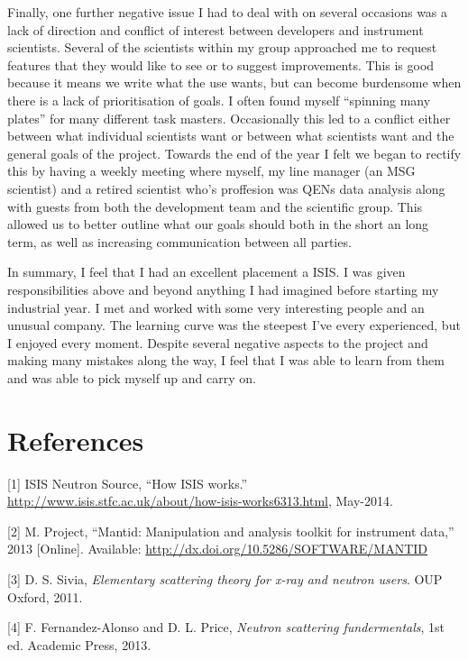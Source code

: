 \documentclass[paper=a4, fontsize=11pt]{scrartcl}	%
\numberwithin{equation}{section}															%
\numberwithin{figure}{section}																%
\numberwithin{table}{section}
\begin{document}
Finally, one further negative issue I had to deal with on several
occasions was a lack of direction and conflict of interest between
developers and instrument scientists. Several of the scientists within
my group approached me to request features that they would like to see
or to suggest improvements. This is good because it means we write what
the use wants, but can become burdensome when there is a lack of
prioritisation of goals. I often found myself ``spinning many plates''
for many different task masters. Occasionally this led to a conflict
either between what individual scientists want or between what
scientists want and the general goals of the project. Towards the end of
the year I felt we began to rectify this by having a weekly meeting
where myself, my line manager (an MSG scientist) and a retired scientist
who's proffesion was QENs data analysis along with guests from both the
development team and the scientific group. This allowed us to better
outline what our goals should both in the short an long term, as well as
increasing communication between all parties.

In summary, I feel that I had an excellent placement a ISIS. I was given
responsibilities above and beyond anything I had imagined before
starting my industrial year. I met and worked with some very interesting
people and an unusual company. The learning curve was the steepest I've
every experienced, but I enjoyed every moment. Despite several negative
aspects to the project and making many mistakes along the way, I feel
that I was able to learn from them and was able to pick myself up and
carry on.

\section*{References}\label{references}

{[}1{]} ISIS Neutron Source, ``How ISIS works.''
\url{http://www.isis.stfc.ac.uk/about/how-isis-works6313.html},
May-2014.

{[}2{]} M. Project, ``Mantid: Manipulation and analysis toolkit for
instrument data,'' 2013 {[}Online{]}. Available:
\url{http://dx.doi.org/10.5286/SOFTWARE/MANTID}

{[}3{]} D. S. Sivia, \emph{Elementary scattering theory for x-ray and
neutron users}. OUP Oxford, 2011.

{[}4{]} F. Fernandez-Alonso and D. L. Price, \emph{Neutron scattering
fundermentals}, 1st ed. Academic Press, 2013.
\end{document}
